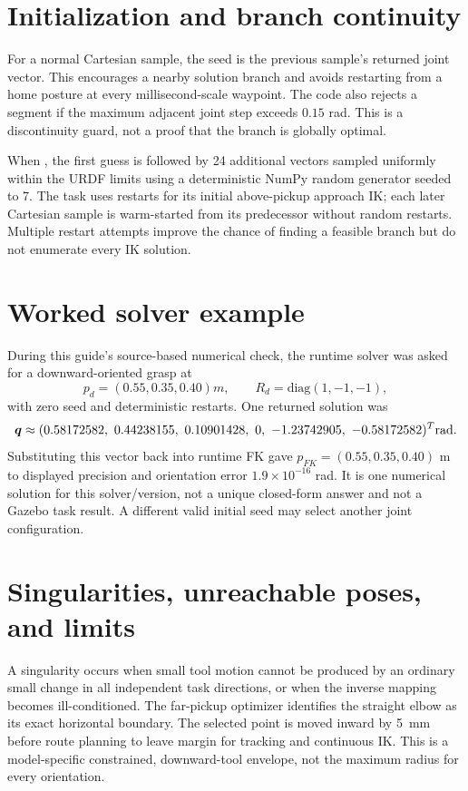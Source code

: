 \section{Initialization and branch continuity}
For a normal Cartesian sample, the seed is the previous sample's returned
joint vector. This encourages a nearby solution branch and avoids restarting
from a home posture at every millisecond-scale waypoint. The code also rejects
a segment if the maximum adjacent joint step exceeds $0.15$ rad. This is a
discontinuity guard, not a proof that the branch is globally optimal.

When , the first guess is followed by 24 additional vectors
sampled uniformly within the URDF limits using a deterministic NumPy random
generator seeded to 7. The task uses restarts for its initial above-pickup
approach IK; each later Cartesian sample is warm-started from its predecessor
without random restarts. Multiple restart attempts improve the chance of
finding a feasible branch but do not enumerate every IK solution.

\section{Worked solver example}
During this guide's source-based numerical check, the runtime solver was asked
for a downward-oriented grasp at
\begin{equation}
 p_d=(0.55,0.35,0.40)\si{m},\qquad R_d=\mathrm{diag}(1,-1,-1),
\end{equation}
with zero seed and deterministic restarts. One returned solution was
\begin{equation}
 \qvec\approx(0.58172582,\ 0.44238155,\ 0.10901428,\ 0,\ -1.23742905,\ -0.58172582)^T\si{rad}.
 \label{eq:ik-example}
\end{equation}
Substituting this vector back into runtime FK gave
$p_{FK}=(0.55,0.35,0.40)$ m to displayed precision and orientation error
$1.9\times10^{-16}$ rad. It is one numerical solution for this solver/version,
not a unique closed-form answer and not a Gazebo task result. A different
valid initial seed may select another joint configuration.

\section{Singularities, unreachable poses, and limits}
A singularity occurs when small tool motion cannot be produced by an ordinary
small change in all independent task directions, or when the inverse mapping
becomes ill-conditioned. The far-pickup optimizer identifies the straight
elbow as its exact horizontal boundary. The selected point is moved inward by
\SI{5}{mm} before route planning to leave margin for tracking and continuous
IK. This is a model-specific constrained, downward-tool envelope, not the
maximum radius for every orientation.

